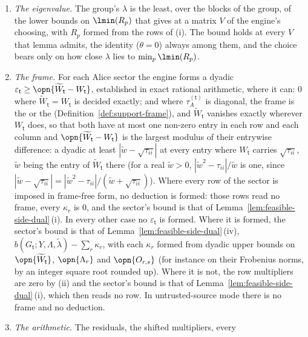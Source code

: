 \begin{requirement}
\begin{enumerate}[label=(\roman*),leftmargin=2.4em]
  $\Lambda_r\succeq0$ holds exactly.
\item \emph{The eigenvalue.} The group's $\lambda$ is the least, over the
  blocks of the group, of the lower bounds on $\lmin(R_p)$ that
   gives at a matrix $V$ of the
  engine's choosing, with $R_p$ formed from the rows of (i). The bound holds
  at every $V$ that lemma admits, the identity ($\theta=0$) always among
  them, and the choice bears only on how close $\lambda$ lies to
  $\min_p\lmin(R_p)$.
\item \emph{The frame.} For each Alice sector the engine forms a dyadic
  $\varepsilon_{\mathsf t}\ge\opn{\widetilde W_{\mathsf t}-W_{\mathsf t}}$,
  established in exact rational arithmetic, where it can: $0$ where
  $\widetilde W_{\mathsf t}=W_{\mathsf t}$ is decided exactly; and where
  $\tau^{(\mathsf t)}_A$ is diagonal, the frame is the  or
  the  (Definition~\ref{def:support-frame}), and
  $\widetilde W_{\mathsf t}$ vanishes exactly wherever $W_{\mathsf t}$
  does, so that both have at most one non-zero entry in each row and each
  column and $\opn{\widetilde W_{\mathsf t}-W_{\mathsf t}}$ is the largest
  modulus of their entrywise difference: a dyadic at least
  $|\widetilde w-\sqrt{\tau_{ii}}|$ at every entry where $W_{\mathsf t}$
  carries $\sqrt{\tau_{ii}}$, $\widetilde w$ being the entry of
  $\widetilde W_{\mathsf t}$ there (for a real $\widetilde w>0$,
  $|\widetilde w^{2}-\tau_{ii}|/\widetilde w$ is one, since
  $|\widetilde w-\sqrt{\tau_{ii}}|=|\widetilde w^{2}-\tau_{ii}|/
  (\widetilde w+\sqrt{\tau_{ii}})$). Where every row of the sector is
  imposed in frame-free form, no deduction is formed: those rows read no
  frame, every $\kappa_r$ is $0$, and the sector's bound is that of
  Lemma~\ref{lem:feasible-side-dual}\,(i). In every other case no
  $\varepsilon_{\mathsf t}$ is formed. Where it is formed, the sector's bound
  is that of Lemma~\ref{lem:feasible-side-dual}\,(iv),
  $b(G_{\mathsf t};Y,\Lambda,\widetilde\lambda)-\sum_r\kappa_r$, with each
  $\kappa_r$ formed from dyadic upper bounds on
  $\opn{\widetilde W_{\mathsf t}}$, $\opn{\Lambda_r}$ and $\opn{O_{r,s}}$
  (for instance on their Frobenius norms, by an integer square root rounded
  up). Where it is not, the row multipliers are zero by (ii) and the
  sector's bound is that of Lemma~\ref{lem:feasible-side-dual}\,(i), which
  then reads no row. In untrusted-source mode there is no frame and no
  deduction.
\item \emph{The arithmetic.} The residuals, the shifted multipliers, every

\end{enumerate}
\end{requirement}
